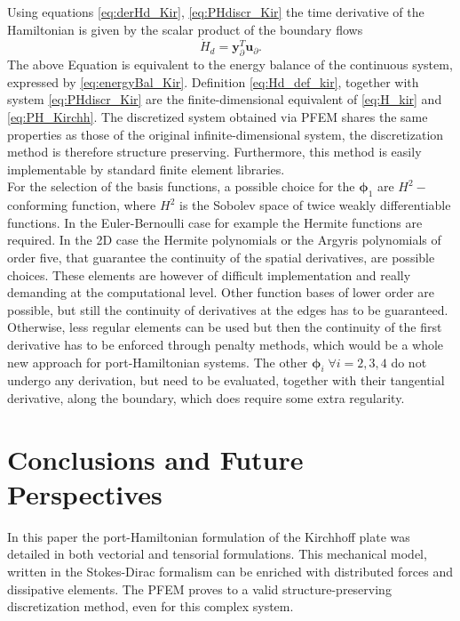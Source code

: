 \documentclass[preprint,12pt]{elsarticle}
\begin{document}
	Using equations \eqref{eq:derHd_Kir}, \eqref{eq:PHdiscr_Kir} the time derivative of the Hamiltonian is given by the scalar product of the boundary flows
	\begin{equation}
	\dot{H}_d = \bm{y}_{\partial}^T \bm{u}_{\partial}.
	\end{equation}
	The above Equation is equivalent to the energy balance of the continuous system, expressed by \eqref{eq:energyBal_Kir}. Definition \eqref{eq:Hd_def_kir}, together with system \eqref{eq:PHdiscr_Kir} are the finite-dimensional equivalent of \eqref{eq:H_kir} and  \eqref{eq:PH_Kirchh}. The discretized system obtained via PFEM shares the same properties as those of the original infinite-dimensional system, the discretization method is therefore structure preserving. Furthermore, this method is easily implementable by standard finite element libraries. \\
	
	For the selection of the basis functions, a possible choice for the $\bm{\phi}_1$ are $H^2-$conforming function, where $H^2$ is the Sobolev space of twice weakly differentiable functions. In the Euler-Bernoulli case for example the Hermite functions are required. In the 2D case the Hermite polynomials or the Argyris polynomials of order five, that guarantee the continuity of the spatial derivatives, are possible choices. These elements are however of difficult implementation and really demanding at the computational level. Other function bases of lower order are possible, but still the continuity of derivatives at the edges has to be guaranteed. Otherwise, less regular elements can be used but then the continuity of the first derivative has to be enforced through penalty methods, which would be a whole new approach for port-Hamiltonian systems.  The other $\bm{\phi}_i \; \forall i=2,3,4$ do not undergo any derivation, but need to be evaluated, together with their tangential derivative, along the boundary, which does require some extra regularity. 

	
	\section*{Conclusions and Future Perspectives}
  	In this paper the port-Hamiltonian formulation of the Kirchhoff plate was detailed in both vectorial and tensorial formulations. This mechanical model, written in the Stokes-Dirac formalism can be enriched with distributed forces and dissipative elements. The PFEM proves to a valid structure-preserving discretization method, even for this complex system. \\
  	
\end{document}
